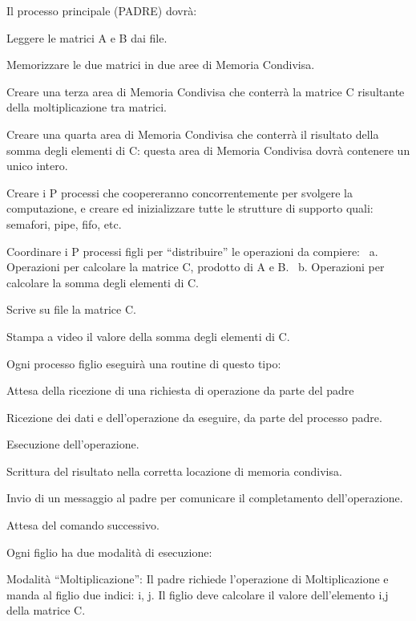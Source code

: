 Il processo principale (P\+A\+D\+RE) dovrà\+:
\begin{DoxyEnumerate}
\item Leggere le matrici A e B dai file.
\item Memorizzare le due matrici in due aree di Memoria Condivisa.
\item Creare una terza area di Memoria Condivisa che conterrà la matrice C risultante della moltiplicazione tra matrici.
\item Creare una quarta area di Memoria Condivisa che conterrà il risultato della somma degli elementi di C\+: questa area di Memoria Condivisa dovrà contenere un unico intero.
\item Creare i P processi che coopereranno concorrentemente per svolgere la computazione, e creare ed inizializzare tutte le strutture di supporto quali\+: semafori, pipe, fifo, etc.
\item Coordinare i P processi figli per “distribuire” le operazioni da compiere\+:~\newline
 a. Operazioni per calcolare la matrice C, prodotto di A e B.~\newline
 b. Operazioni per calcolare la somma degli elementi di C.
\item Scrive su file la matrice C.
\item Stampa a video il valore della somma degli elementi di C.
\end{DoxyEnumerate}

Ogni processo figlio eseguirà una routine di questo tipo\+:
\begin{DoxyEnumerate}
\item Attesa della ricezione di una richiesta di operazione da parte del padre
\item Ricezione dei dati e dell’operazione da eseguire, da parte del processo padre.
\item Esecuzione dell’operazione.
\item Scrittura del risultato nella corretta locazione di memoria condivisa.
\item Invio di un messaggio al padre per comunicare il completamento dell’operazione.
\item Attesa del comando successivo.
\end{DoxyEnumerate}

Ogni figlio ha due modalità di esecuzione\+:

Modalità “\+Moltiplicazione”\+: Il padre richiede l’operazione di Moltiplicazione e manda al figlio due indici\+: i, j. Il figlio deve calcolare il valore dell’elemento i,j della matrice C.

